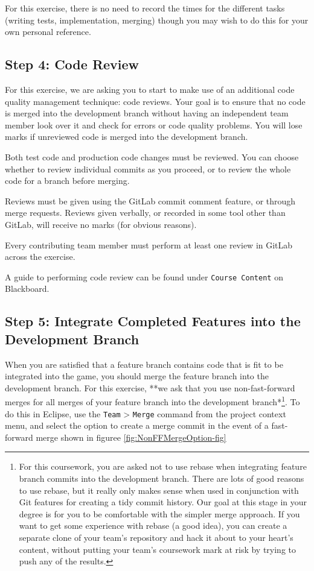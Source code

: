 \documentclass[
]{book}
\begin{document}
For this exercise, there is no need to record the times for the different tasks (writing tests, implementation, merging) though you may wish to do this for your own personal reference.

\hypertarget{codereview4}{%
\subsection{Step 4: Code Review}\label{codereview4}}

For this exercise, we are asking you to start to make use of an additional code quality management technique: code reviews. Your goal is to ensure that no code is merged into the development branch without having an independent team member look over it and check for errors or code quality problems. You will lose marks if unreviewed code is merged into the development branch.

Both test code and production code changes must be reviewed. You can choose whether to review individual commits as you proceed, or to review the whole code for a branch before merging.

Reviews must be given using the GitLab commit comment feature, or through merge requests. Reviews given verbally, or recorded in some tool other than GitLab, will receive no marks (for obvious reasons).

Every contributing team member must perform at least one review in GitLab across the exercise.

A guide to performing code review can be found under \texttt{Course\ Content} on Blackboard.

\hypertarget{devbranch}{%
\subsection{Step 5: Integrate Completed Features into the Development Branch}\label{devbranch}}

When you are satisfied that a feature branch contains code that is fit to be integrated into the game, you should merge the feature branch into the development branch. For this exercise, **we ask that you use non-fast-forward merges for all merges of your feature branch into the development branch*\footnote{For this coursework, you are asked not to use rebase when integrating feature branch commits into the development branch. There are lots of good reasons to use rebase, but it really only makes sense when used in conjunction with Git features for creating a tidy commit history. Our goal at this stage in your degree is for you to be comfortable with the simpler merge approach. If you want to get some experience with rebase (a good idea), you can create a separate clone of your team's repository and hack it about to your heart's content, without putting your team's coursework mark at risk by trying to push any of the results.}. To do this in Eclipse, use the \texttt{Team} \textgreater{} \texttt{Merge} command from the project context menu, and select the option to create a merge commit in the event of a fast-forward merge shown in figuree \ref{fig:NonFFMergeOption-fig}
\end{document}
